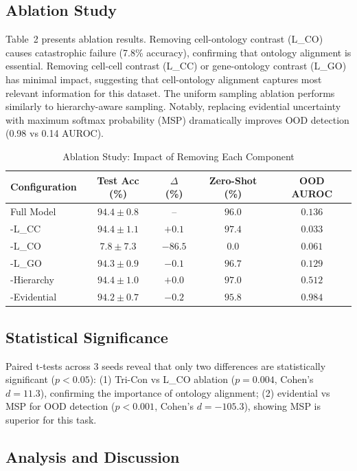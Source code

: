 \documentclass[11pt]{article}
\begin{document}
\subsection{Ablation Study}

Table~2 presents ablation results. Removing cell-ontology contrast (L\_CO) causes catastrophic failure (7.8\% accuracy), confirming that ontology alignment is essential. Removing cell-cell contrast (L\_CC) or gene-ontology contrast (L\_GO) has minimal impact, suggesting that cell-ontology alignment captures most relevant information for this dataset. The uniform sampling ablation performs similarly to hierarchy-aware sampling. Notably, replacing evidential uncertainty with maximum softmax probability (MSP) dramatically improves OOD detection (0.98 vs 0.14 AUROC).

\begin{table}[t]
\centering
\caption{Ablation Study: Impact of Removing Each Component}
\label{tab:ablation}
\begin{tabular}{lcccc}
\toprule
Configuration & Test Acc (\%) & $\Delta$ (\%) & Zero-Shot (\%) & OOD AUROC \\
\midrule
Full Model & $94.4 \pm 0.8$ & -- & $96.0$ & $0.136$ \\
\midrule
-L\_CC & $94.4 \pm 1.1$ & $+0.1$ & $97.4$ & $0.033$ \\
-L\_CO & $7.8 \pm 7.3$ & $-86.5$ & $0.0$ & $0.061$ \\
-L\_GO & $94.3 \pm 0.9$ & $-0.1$ & $96.7$ & $0.129$ \\
-Hierarchy & $94.4 \pm 1.0$ & $+0.0$ & $97.0$ & $0.512$ \\
-Evidential & $94.2 \pm 0.7$ & $-0.2$ & $95.8$ & $0.984$ \\
\bottomrule
\end{tabular}
\end{table}

\subsection{Statistical Significance}

Paired t-tests across 3 seeds reveal that only two differences are statistically significant ($p < 0.05$): (1) Tri-Con vs L\_CO ablation ($p = 0.004$, Cohen's $d = 11.3$), confirming the importance of ontology alignment; (2) evidential vs MSP for OOD detection ($p < 0.001$, Cohen's $d = -105.3$), showing MSP is superior for this task.

\subsection{Analysis and Discussion}
\end{document}
